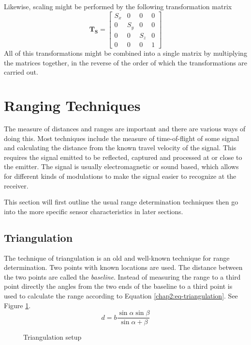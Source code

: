 Likewise, scaling might be performed by the following transformation matrix
\begin{equation}
    \label{chap2:eq-TransformationMatrixScaling}
    \mathbf{T_S} = \left [ \begin{array}{cccc}
                                S_x & 0 & 0 & 0 \\
                                0 & S_y & 0 & 0 \\
                                0 & 0 & S_z & 0 \\
                                0 & 0 & 0 & 1 
                                 \end{array} \right]
\end{equation}
All of this transformations might be combined into a single matrix by multiplying the
matrices together, in the reverse of the order of which the transformations are carried
out. 


\section{Ranging Techniques}
The measure of distances and ranges are important and there are various ways of doing
this. Most techniques include the measure of time-of-flight of some signal and calculating
the distance from the known travel velocity of the signal. This requires the signal
emitted to be reflected, captured and processed at or close to the emitter. The signal is
usually electromagnetic or sound based, which allows for different kinds of modulations to
make the signal easier to recognize at the receiver.


This section will first outline the usual range determination techniques then go into the
more specific sensor characteristics in later sections.


\subsection{Triangulation}
The technique of triangulation is an old and well-known technique for range determination.
Two points with known locations are used. The distance between the two points are called
the \emph{baseline}. Instead of measuring the range to a third point directly the angles
from the two ends of the baseline to a third point is used to calculate the range
according to Equation \ref{chap2:eq-triangulation}. See Figure
\ref{chap2:fig-triangulation}.
\begin{equation}
    \label{chap2:eq-triangulation}
    d = b \frac{\sin{\alpha} \sin{\beta}}{\sin{\alpha + \beta}}
\end{equation}
\begin{figure}[htbp]
    \caption{Triangulation setup}
    \label{chap2:fig-triangulation}
\end{figure}

